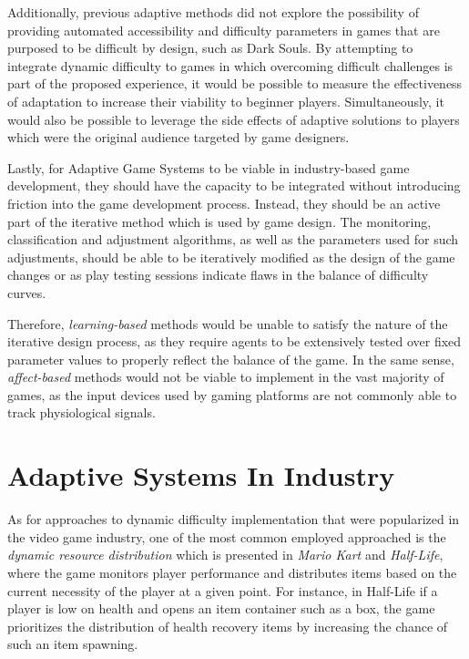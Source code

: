 Additionally, previous adaptive methods did not explore the possibility of providing automated accessibility and difficulty parameters in games that are purposed to be difficult by design, such as Dark Souls. By attempting to integrate dynamic difficulty to games in which overcoming difficult challenges is part of the proposed experience, it would be possible to measure the effectiveness of adaptation to increase their viability to beginner players. Simultaneously, it would also be possible to leverage the side effects of adaptive solutions to players which were the original audience targeted by game designers.

Lastly, for Adaptive Game Systems to be viable in industry-based game development, they should have the capacity to be integrated without introducing friction into the game development process. Instead, they should be an active part of the iterative method which is used by game design. The monitoring, classification and adjustment algorithms, as well as the parameters used for such adjustments, should be able to be iteratively modified as the design of the game changes or as play testing sessions indicate flaws in the balance of difficulty curves. 

Therefore, \emph{learning-based} methods would be unable to satisfy the nature of the iterative design process, as they require agents to be extensively tested over fixed parameter values to properly reflect the balance of the game. In the same sense, \emph{affect-based} methods would not be viable to implement in the vast majority of games, as the input devices used by gaming platforms are not commonly able to track physiological signals.


\section{Adaptive Systems In Industry}

As for approaches to dynamic difficulty implementation that were popularized in the video game industry, one of the most common employed approached is the \emph{dynamic resource distribution} which is presented in \emph{Mario Kart} and \emph{Half-Life}, where the game monitors player performance and distributes items based on the current necessity of the player at a given point. For instance, in Half-Life if a player is low on health and opens an item container such as a box, the game prioritizes the distribution of health recovery items by increasing the chance of such an item spawning.

